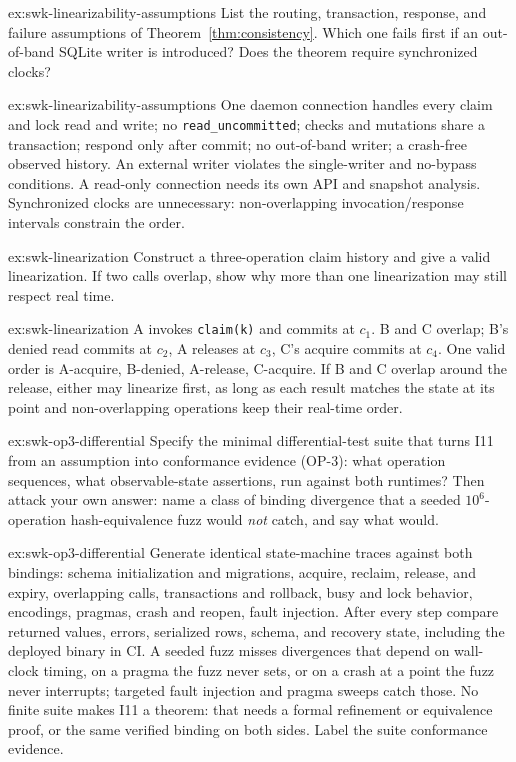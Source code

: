 \documentclass[11pt,a4paper]{article}
\theoremstyle{definition}
\theoremstyle{remark}
\begin{document}
\begin{pdexercise}[kind=Check,rating=1]{ex:swk-linearizability-assumptions}
List the routing, transaction, response, and failure assumptions of Theorem~\ref{thm:consistency}. Which one fails first if an out-of-band SQLite writer is introduced? Does the theorem require synchronized clocks?
\end{pdexercise}
\begin{pdsolution}{ex:swk-linearizability-assumptions}
One daemon connection handles every claim and lock read and write; no \texttt{read\_uncommitted}; checks and mutations share a transaction; respond only after commit; no out-of-band writer; a crash-free observed history. An external writer violates the single-writer and no-bypass conditions. A read-only connection needs its own API and snapshot analysis. Synchronized clocks are unnecessary: non-overlapping invocation/response intervals constrain the order.
\end{pdsolution}
\begin{pdexercise}[kind=Trace,rating=2]{ex:swk-linearization}
Construct a three-operation claim history and give a valid linearization. If two calls overlap, show why more than one linearization may still respect real time.
\end{pdexercise}
\begin{pdsolution}{ex:swk-linearization}
A invokes \texttt{claim(k)} and commits at $c_1$. B and C overlap; B's denied read commits at $c_2$, A releases at $c_3$, C's acquire commits at $c_4$. One valid order is A-acquire, B-denied, A-release, C-acquire. If B and C overlap around the release, either may linearize first, as long as each result matches the state at its point and non-overlapping operations keep their real-time order.
\end{pdsolution}
\begin{pdexercise}[kind=Open,rating=3]{ex:swk-op3-differential}
Specify the minimal differential-test suite that turns I11 from an assumption into conformance evidence (OP-3): what operation sequences, what observable-state assertions, run against both runtimes? Then attack your own answer: name a class of binding divergence that a seeded $10^6$-operation hash-equivalence fuzz would \emph{not} catch, and say what would.
\end{pdexercise}
\begin{pdsolution}{ex:swk-op3-differential}
Generate identical state-machine traces against both bindings: schema initialization and migrations, acquire, reclaim, release, and expiry, overlapping calls, transactions and rollback, busy and lock behavior, encodings, pragmas, crash and reopen, fault injection. After every step compare returned values, errors, serialized rows, schema, and recovery state, including the deployed binary in CI. A seeded fuzz misses divergences that depend on wall-clock timing, on a pragma the fuzz never sets, or on a crash at a point the fuzz never interrupts; targeted fault injection and pragma sweeps catch those. No finite suite makes I11 a theorem: that needs a formal refinement or equivalence proof, or the same verified binding on both sides. Label the suite conformance evidence.
\end{pdsolution}
\end{document}

